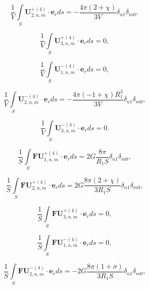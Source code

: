 \begin{equation}
\frac{1}{V}\int\limits_S \mathbf{U}_{2,n,m}^{+(4)}\cdot\mathbf{e}_r ds=-\frac{4\pi(2+\chi)}{3V}\delta_{n1}\delta_{m0},
\label{eq:12:16}
\end{equation}

\begin{equation}
\frac{1}{V}\int\limits_S \mathbf{U}_{3,n,m}^{+(4)}\cdot\mathbf{e}_r ds=0,
\label{eq:12:17}
\end{equation}

\begin{equation}
\frac{1}{V}\int\limits_S \mathbf{U}_{1,n,m}^{-(4)}\cdot\mathbf{e}_r ds=0,
\label{eq:12:18}
\end{equation}

\begin{equation}
\frac{1}{V}\int\limits_S \mathbf{U}_{2,n,m}^{-(4)}\cdot\mathbf{e}_r ds=-\frac{4\pi(-1+\chi)R_1^3}{3V}\delta_{n1}\delta_{m0},
\label{eq:12:19}
\end{equation}

\begin{equation}
\frac{1}{V}\int\limits_S \mathbf{U}_{3,n,m}^{-(4)}\cdot\mathbf{e}_r ds=0.
\label{eq:12:20}
\end{equation}

\begin{equation}
\frac{1}{S}\int\limits_S \mathbf{FU}_{1,n,m}^{+(4)}\cdot\mathbf{e}_r ds=2G\frac{8\pi}{R_1 S}\delta_{n1}\delta_{m0},
\label{eq:12:21}
\end{equation}

\begin{equation}
\frac{1}{S}\int\limits_S \mathbf{FU}_{2,n,m}^{+(4)}\cdot\mathbf{e}_r ds=2G\frac{8\pi(2+\chi)}{3R_1 S}\delta_{n1}\delta_{m0},
\label{eq:12:22}
\end{equation}

\begin{equation}
\frac{1}{S}\int\limits_S \mathbf{FU}_{3,n,m}^{+(4)}\cdot\mathbf{e}_r ds=0,
\label{eq:12:23}
\end{equation}

\begin{equation}
\frac{1}{S}\int\limits_S \mathbf{FU}_{1,n,m}^{-(4)}\cdot\mathbf{e}_r ds=0,
\label{eq:12:24}
\end{equation}

\begin{equation}
\frac{1}{S}\int\limits_S \mathbf{FU}_{2,n,m}^{-(4)}\cdot\mathbf{e}_r ds=-2G\frac{8\pi(1+\sigma)}{3R_1 S}\delta_{n1}\delta_{m0},
\label{eq:12:25}
\end{equation}

